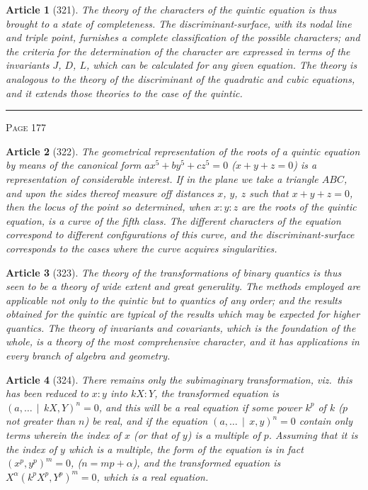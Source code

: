 \documentclass[11pt,a4paper]{article}
\theoremstyle{cayley}
\newtheorem{art}{Article}
\begin{document}
\begin{art}[321]
The theory of the characters of the quintic equation is thus brought to a state of completeness. The discriminant-surface, with its nodal line and triple point, furnishes a complete classification of the possible characters; and the criteria for the determination of the character are expressed in terms of the invariants $J$, $D$, $L$, which can be calculated for any given equation. The theory is analogous to the theory of the discriminant of the quadratic and cubic equations, and it extends those theories to the case of the quintic.
\end{art}

\vspace{1em}
\noindent\rule{\textwidth}{0.4pt}
\begin{center}\textsc{Page 177}\end{center}
\newpage

\begin{art}[322]
The geometrical representation of the roots of a quintic equation by means of the canonical form $ax^5 + by^5 + cz^5 = 0$ ($x+y+z=0$) is a representation of considerable interest. If in the plane we take a triangle $ABC$, and upon the sides thereof measure off distances $x$, $y$, $z$ such that $x+y+z=0$, then the locus of the point so determined, when $x:y:z$ are the roots of the quintic equation, is a curve of the fifth class. The different characters of the equation correspond to different configurations of this curve, and the discriminant-surface corresponds to the cases where the curve acquires singularities.
\end{art}

\begin{art}[323]
The theory of the transformations of binary quantics is thus seen to be a theory of wide extent and great generality. The methods employed are applicable not only to the quintic but to quantics of any order; and the results obtained for the quintic are typical of the results which may be expected for higher quantics. The theory of invariants and covariants, which is the foundation of the whole, is a theory of the most comprehensive character, and it has applications in every branch of algebra and geometry.
\end{art}

\begin{art}[324]
There remains only the subimaginary transformation, viz.\ this has been reduced to $x:y$ into $kX:Y$, the transformed equation is $(a, \ldots \,\mid\, kX, Y)^n = 0$, and this will be a real equation if some power $k^p$ of $k$ ($p$ not greater than $n$) be real, and if the equation $(a, \ldots \,\mid\, x, y)^n = 0$ contain only terms wherein the index of $x$ (or that of $y$) is a multiple of $p$. Assuming that it is the index of $y$ which is a multiple, the form of the equation is in fact $(x^p, y^p)^m = 0$, ($n = mp + \alpha$), and the transformed equation is $X^\alpha(k^pX^p, Y^p)^m = 0$, which is a real equation.
\end{art}
\end{document}
